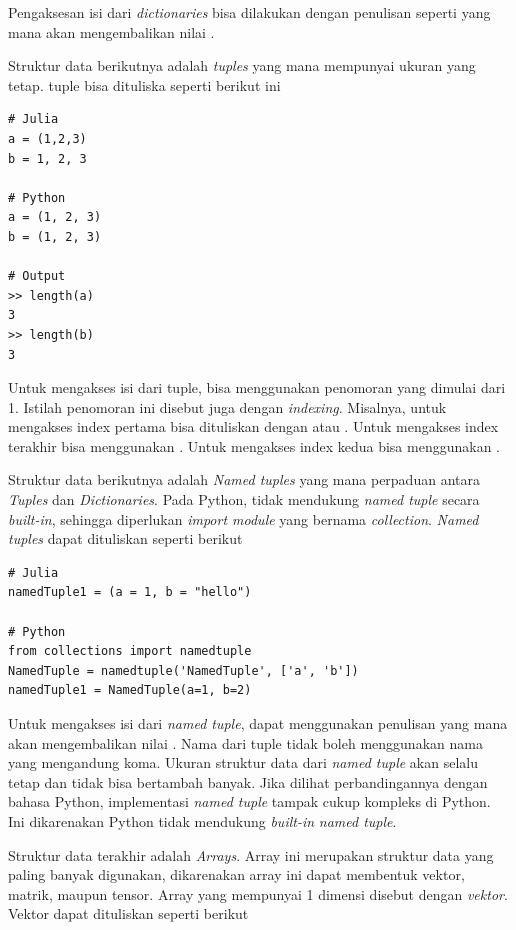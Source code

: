 \noindent
Pengaksesan isi dari \emph{dictionaries} bisa dilakukan dengan penulisan seperti
 yang mana akan mengembalikan nilai .

Struktur data berikutnya adalah \emph{tuples} yang mana mempunyai ukuran yang
tetap. tuple bisa dituliska seperti berikut ini

\begin{lstlisting}
# Julia
a = (1,2,3)
b = 1, 2, 3

# Python
a = (1, 2, 3)
b = (1, 2, 3)

# Output
>> length(a)
3
>> length(b)
3
\end{lstlisting}

\noindent
Untuk mengakses isi dari tuple, bisa menggunakan penomoran yang dimulai dari 1. Istilah
penomoran ini disebut juga dengan \emph{indexing}. Misalnya, untuk mengakses
index pertama bisa dituliskan dengan  atau . Untuk mengakses
index terakhir bisa menggunakan . Untuk mengakses index kedua bisa menggunakan
.

Struktur data berikutnya adalah \emph{Named tuples} yang mana perpaduan antara
\emph{Tuples} dan \emph{Dictionaries}. Pada Python, tidak mendukung \emph{named
  tuple} secara \emph{built-in}, sehingga diperlukan \emph{import module} yang
bernama \emph{collection}. \emph{Named tuples} dapat dituliskan seperti berikut

\begin{lstlisting}
# Julia
namedTuple1 = (a = 1, b = "hello")

# Python
from collections import namedtuple
NamedTuple = namedtuple('NamedTuple', ['a', 'b'])
namedTuple1 = NamedTuple(a=1, b=2)
\end{lstlisting}

\noindent
Untuk mengakses isi dari \emph{named tuple}, dapat menggunakan penulisan 
yang mana akan mengembalikan nilai . Nama dari tuple tidak boleh
menggunakan nama yang mengandung koma. Ukuran struktur data dari \emph{named
  tuple} akan selalu tetap dan tidak bisa bertambah banyak. Jika dilihat perbandingannya
dengan bahasa Python, implementasi \emph{named tuple} tampak cukup kompleks di Python.
Ini dikarenakan Python tidak mendukung \emph{built-in} \emph{named tuple}.

Struktur data terakhir adalah \emph{Arrays}. Array ini merupakan struktur data
yang paling banyak digunakan, dikarenakan array ini dapat membentuk vektor,
matrik, maupun tensor. Array yang mempunyai 1 dimensi disebut dengan
\emph{vektor}. Vektor dapat dituliskan seperti berikut

